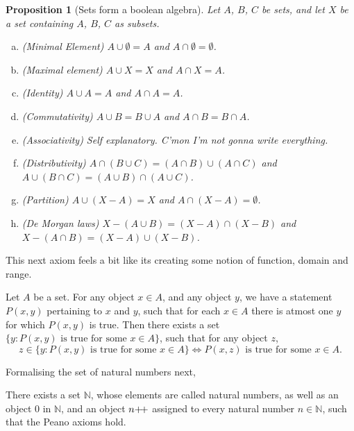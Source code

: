 \documentclass[12pt]{article}
\newtheorem{proposition}{Proposition}[section]
\theoremstyle{remark}
\begin{document}
\begin{proposition}[Sets form a boolean algebra]
    Let $ A $, $ B $, $ C $ be sets, and let $ X $ be a set containing $ A $, $ B $, $ C $ as subsets. 
    \begin{enumerate}[(a)]
	\item (Minimal Element) $ A \cup \emptyset = A $ and $ A \cap \emptyset = \emptyset $.
	\item (Maximal element) $ A \cup X = X $ and $ A \cap X = A $.
	\item (Identity) $ A \cup A = A $ and $ A \cap A = A $.
	\item (Commutativity) $ A \cup B = B \cup A $ and $ A \cap B = B \cap A $.
	\item (Associativity) Self explanatory. C'mon I'm not gonna write everything.
	\item (Distributivity) $ A \cap (B \cup C) = (A \cap B) \cup (A \cap C) $ and $ A \cup (B \cap C) = (A \cup B) \cap (A \cup C) $.
	\item (Partition) $ A \cup (X - A) = X $ and $ A \cap (X - A) = \emptyset $.
	\item (De Morgan laws) $ X - (A \cup B) = (X - A) \cap (X - B) $ and $ X - (A \cap B) = (X - A) \cup (X - B) $.
    \end{enumerate}
\end{proposition}

This next axiom feels a bit like its creating some notion of function, domain and range. 

\begin{important}
	Let $ A $ be a set. For any object $ x \in A $, and any object $ y $, we have a statement $ P(x, y) $ pertaining to $ x $ and $ y $, such that for each $ x \in A $ there is atmost one $ y $ for which $ P(x, y) $ is true. Then there exists a set $ \{ y : P(x, y) \text{ is true for some } x \in A \} $, such that for any object $ z $, 
	\begin{equation*}
		z \in \{y : P(x, y) \text{ is true for some } x \in A \} \iff P(x, z) \text{ is true for some } x \in A.
	\end{equation*}
	
\end{important}

Formalising the set of natural numbers next, 

\begin{important}
	There exists a set $ \mathbb{N} $, whose elements are called natural numbers, as well as an object $ 0 $ in $ \mathbb{N} $, and an object $ n\inc $ assigned to every natural number $ n \in \mathbb{N} $, such that the Peano axioms hold.
\end{important}
\end{document}
